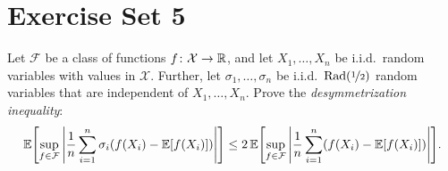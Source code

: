 \section{Exercise Set 5}

\begin{exercise}
\end{exercise}


\begin{exercise}
Let $\mathcal{F}$ be a class of functions $f \colon \mathcal{X} \to \mathbb{R}$, and let $X_1, \dots, X_n$ be i.i.d.\ random variables with values in $\mathcal{X}$. Further, let $\sigma_1, \dots, \sigma_n$ be i.i.d.\ $\operatorname{Rad}(\nicefrac{1}{2})$ random variables that are independent of $X_1, \dots, X_n$. Prove the \emph{desymmetrization inequality}:
\[
    \Exp\left[\sup_{f \in \mathcal{F}} \abs{\frac{1}{n} \sum_{i=1}^n \sigma_i (f(X_i) - \Exp[f(X_i)])}\right] \leq 2 \Exp\left[\sup_{f \in \mathcal{F}} \abs{\frac{1}{n} \sum_{i=1}^n (f(X_i) - \Exp[f(X_i)])}\right].
\]
\end{exercise}


\begin{exercise}
\end{exercise}
